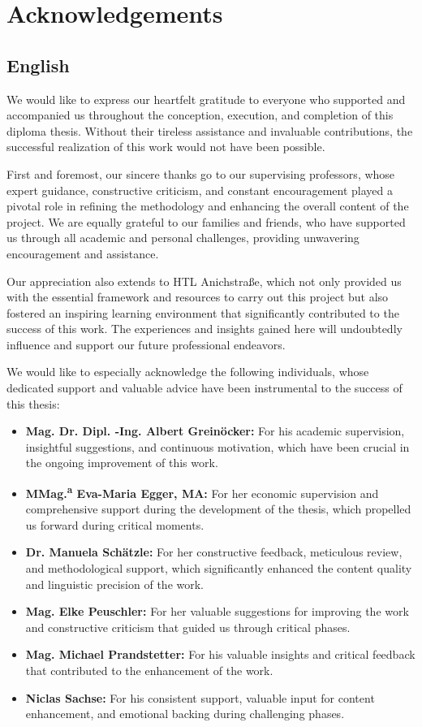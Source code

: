 \chapter{Acknowledgements}
\label{cha:acknowledgements}

\section*{English}

We would like to express our heartfelt gratitude to everyone who supported and accompanied us throughout the conception, execution, and completion of this diploma thesis. Without their tireless assistance and invaluable contributions, the successful realization of this work would not have been possible.

First and foremost, our sincere thanks go to our supervising professors, whose expert guidance, constructive criticism, and constant encouragement played a pivotal role in refining the methodology and enhancing the overall content of the project. We are equally grateful to our families and friends, who have supported us through all academic and personal challenges, providing unwavering encouragement and assistance.

Our appreciation also extends to HTL Anichstraße, which not only provided us with the essential framework and resources to carry out this project but also fostered an inspiring learning environment that significantly contributed to the success of this work. The experiences and insights gained here will undoubtedly influence and support our future professional endeavors.

We would like to especially acknowledge the following individuals, whose dedicated support and valuable advice have been instrumental to the success of this thesis:
\begin{itemize}
    \item \textbf{Mag. Dr. Dipl. -Ing. Albert Greinöcker:} For his academic supervision, insightful suggestions, and continuous motivation, which have been crucial in the ongoing improvement of this work.
    \item \textbf{MMag.\textsuperscript{a} Eva-Maria Egger, MA:} For her economic supervision and comprehensive support during the development of the thesis, which propelled us forward during critical moments.
    \item \textbf{Dr. Manuela Schätzle:} For her constructive feedback, meticulous review, and methodological support, which significantly enhanced the content quality and linguistic precision of the work.
    \item \textbf{Mag. Elke Peuschler:} For her valuable suggestions for improving the work and constructive criticism that guided us through critical phases.
    \item \textbf{Mag. Michael Prandstetter:} For his valuable insights and critical feedback that contributed to the enhancement of the work.
    \item \textbf{Niclas Sachse:} For his consistent support, valuable input for content enhancement, and emotional backing during challenging phases.
\end{itemize}


